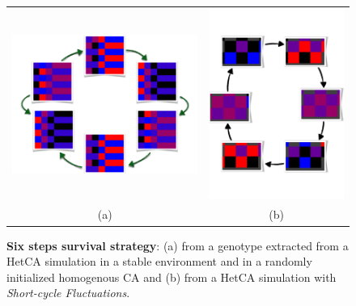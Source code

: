  
\begin{figure}[h]
\centering
\begin{tabular}{cc}
    \includegraphics[width=0.45\columnwidth]{img/4steptransition}& \includegraphics[width=0.45\columnwidth]{img/cyclesReal}\\
    (a) & (b)
\end{tabular}
\caption{\textbf{Six steps survival strategy}: (a) from a genotype extracted from a HetCA simulation in a stable environment and in a randomly initialized homogenous CA and (b) from a HetCA simulation with \emph{Short-cycle Fluctuations}. }
  \label{foursteps}
\end{figure}
 






